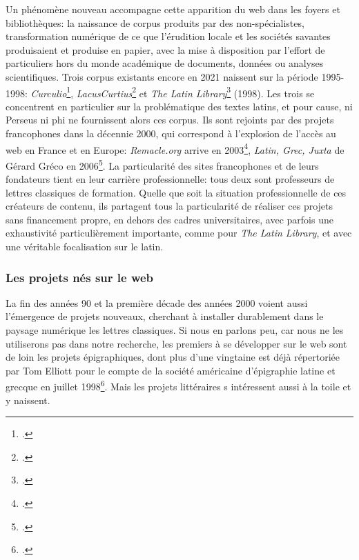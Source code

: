 Un phénomène nouveau accompagne cette apparition du web dans les foyers et bibliothèques: la naissance de corpus produits par des non-spécialistes, transformation numérique de ce que l'érudition locale et les sociétés savantes produisaient et produise en papier, avec la mise à disposition par l'effort de particuliers hors du monde académique de documents, données ou analyses scientifiques. Trois corpus existants encore en 2021 naissent sur la période 1995-1998: \textit{Curculio}\footcite{hendry_curculio_1995}, \textit{LacusCurtius}\footcite{lomarcan_lacuscurtius_1999} et \textit{The Latin Library}\footcite{carey_latin_1998} (1998). Les trois se concentrent en particulier sur la problématique des textes latins, et pour cause, ni Perseus ni \acrshort{phi} ne fournissent alors ces corpus. Ils sont rejoints par des projets francophones dans la décennie 2000, qui correspond à l'explosion de l'accès au web en France et en Europe: \textit{Remacle.org} arrive en 2003\footcite{philippe_remacle_site_2008}, \textit{Latin, Grec, Juxta} de Gérard Gréco en 2006\footcite{gerard_greco_latin_2006}. La particularité des sites francophones et de leurs fondateurs tient en leur carrière professionnelle: tous deux sont professeurs de lettres classiques de formation. Quelle que soit la situation professionnelle de ces créateurs de contenu, ils partagent tous la particularité de réaliser ces projets sans financement propre, en dehors des cadres universitaires, avec parfois une exhaustivité particulièrement importante, comme pour \textit{The Latin Library}, et avec une véritable focalisation sur le latin.

\subsubsection{Les projets nés sur le web}

La fin des années 90 et la première décade des années 2000 voient aussi l'émergence de projets nouveaux, cherchant à installer durablement dans le paysage numérique les lettres classiques. Si nous en parlons peu, car nous ne les utiliserons pas dans notre recherche, les premiers à se développer sur le web sont de loin les projets épigraphiques, dont plus d'une vingtaine est déjà répertoriée par Tom Elliott pour le compte de la société américaine d'épigraphie latine et grecque en juillet 1998\footcite{elliott_links_1998}. Mais les projets littéraires s intéressent aussi à la toile et y naissent.

